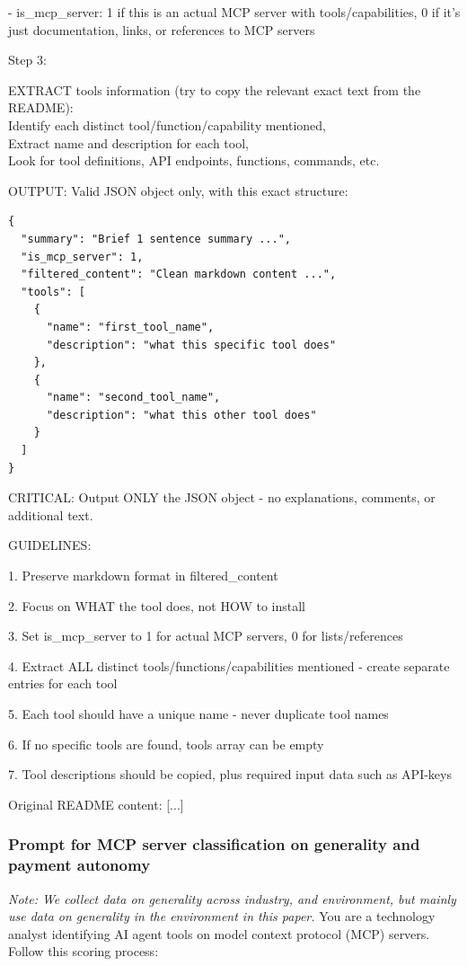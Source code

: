 \documentclass[manuscript,screen,nonacm,oneside]{acmart}
\begin{document}
- is\_mcp\_server: 1 if this is an actual MCP server with tools/capabilities, 0 if it's just documentation, links, or references to MCP servers

Step 3:

EXTRACT tools information (try to copy the relevant exact text from the README):\\
Identify each distinct tool/function/capability mentioned,\\
Extract name and description for each tool,\\
Look for tool definitions, API endpoints, functions, commands, etc.

OUTPUT: Valid JSON object only, with this exact structure:

\begin{lstlisting}
{
  "summary": "Brief 1 sentence summary ...",
  "is_mcp_server": 1,
  "filtered_content": "Clean markdown content ...",
  "tools": [
    {
      "name": "first_tool_name",
      "description": "what this specific tool does"
    },
    {
      "name": "second_tool_name",
      "description": "what this other tool does"
    }
  ]
}
\end{lstlisting}

CRITICAL: Output ONLY the JSON object - no explanations, comments, or additional text.

GUIDELINES:

1. Preserve markdown format in filtered\_content

2. Focus on WHAT the tool does, not HOW to install

3. Set is\_mcp\_server to 1 for actual MCP servers, 0 for lists/references

4. Extract ALL distinct tools/functions/capabilities mentioned - create separate entries for each tool

5. Each tool should have a unique name - never duplicate tool names

6. If no specific tools are found, tools array can be empty

7. Tool descriptions should be copied, plus required input data such as API-keys

Original README content: [...]

\subsubsection{Prompt for MCP server classification on generality and payment autonomy}
\textit{Note: We collect data on generality across industry, and environment, but mainly use data on generality in the environment in this paper. }
You are a technology analyst identifying AI agent tools on model context protocol (MCP) servers. Follow this scoring process:
\end{document}
